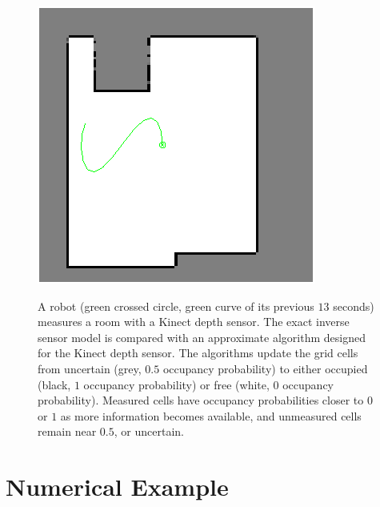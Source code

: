 \documentclass[letterpaper, 10pt, conference]{ieeeconf}
\newcommand{\refeqn}[1]{(\ref{eqn:#1})}
\begin{document}
\begin{figure}
{		{\includegraphics[height=0.4\columnwidth]{Compare_ISM_5.png}
	}
}
\caption{A robot (green crossed circle, green curve of its previous $13$ seconds) measures a room with a Kinect depth sensor. The exact inverse sensor model is compared with an approximate algorithm designed for the Kinect depth sensor. The algorithms update the grid cells from uncertain (grey, $0.5$ occupancy probability) to either occupied (black, $1$ occupancy probability) or free (white, $0$ occupancy probability). Measured cells have occupancy probabilities closer to $0$ or $1$ as more information becomes available, and unmeasured cells remain near $0.5$, or uncertain.
}
\label{fig:NumResOccProbs}
\end{figure}

	
\section{Numerical Example}
\label{sec:NumRes}

\end{document}
